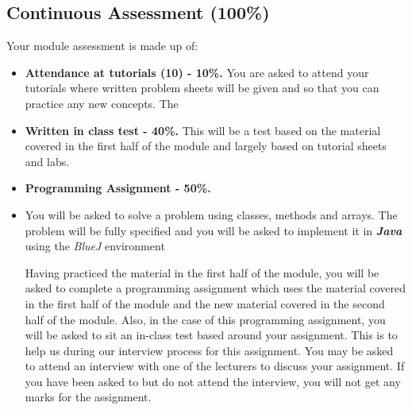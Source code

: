 \documentclass{article}
\begin{document}
\subsection{Continuous Assessment (100\%) }
Your module assessment  is made up of:  
    \begin{itemize}
        \item \textbf{Attendance at tutorials (10) - 10\%.} You are  asked to attend your tutorials where written problem sheets will be given and so that you can practice any new concepts. The 
        \item \textbf{Written in class test - 40\%.} This will be a test based on the material covered in the first half of the module and largely based on tutorial sheets and labs. 
        \item \textbf{Programming Assignment  - 50\%. }
        \item   You will be asked to solve a problem using classes, methods and arrays. The problem will be fully specified and you will be asked to implement it in \textbf{\textit{Java}} using the \textit{BlueJ} environment

        Having practiced the material in the first half of the module, you will be asked to complete a programming assignment which uses the material covered in the first half of the 
        module and the new material covered in the second half of the module. Also, in the case of this programming assignment, you will be asked 
to sit an in-class test based around your assignment. This is to help us during our interview process for this assignment. You may be asked to attend an interview with one of the lecturers to discuss your assignment.
If you have been asked to but  do not attend the interview, you will not get any marks for the assignment.

        
      
    \end{itemize}
\end{document}
